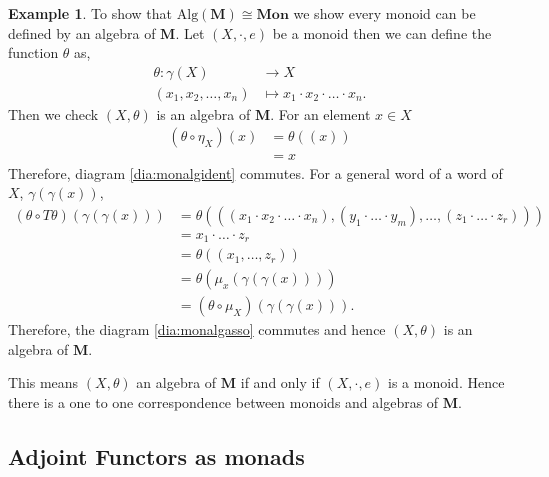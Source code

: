 \documentclass[11pt,a4paper]{article}
\theoremstyle{definition}
\newtheorem{example}[thm]{Example}
\newcommand{\alg}[1]{\mathrm{Alg}(\mathbf{#1})}
\numberwithin{equation}{section}
\begin{document}
\begin{example}
    To show that $\alg{M} \cong \mathbf{Mon}$ we show every monoid can be defined by an algebra of $\mathbf{M}$.
    Let $(X,\cdot,e)$ be a monoid then we can define the function $\theta$ as,
    \begin{align*}
        \theta\colon \gamma(X)&\to X\\
        (x_1,x_2,\dots,x_n)&\mapsto x_1 \cdot x_2 \cdot \dots \cdot x_n.
    \end{align*}
    Then we check $(X,\theta)$ is an algebra of $\mathbf{M}$. For an element $x\in X$
    \begin{align*}
        (\theta \circ \eta_{X}) (x) &= \theta((x)) \\
        &= x
    \end{align*}
    Therefore, diagram \eqref{dia:monalgident} commutes. For a general word of a word of $X$, $\gamma(\gamma(x))$,
    \begin{align*}
        (\theta \circ T\theta)(\gamma(\gamma(x))) &= \theta(((x_1\cdot x_2\cdot\dots \cdot x_{n}),(y_1\cdot\dots\cdot y_m),\dots,(z_1\cdot\dots\cdot z_r))) \\
        &= x_1\cdot\dots\cdot z_r\\
        &= \theta((x_1,\dots, z_r))\\
        &= \theta(\mu_{x}(\gamma(\gamma(x))))\\
        &= (\theta\circ \mu_{X}) (\gamma(\gamma(x))).
    \end{align*}
    Therefore, the diagram \eqref{dia:monalgasso} commutes and hence $(X,\theta)$ is an algebra of $\mathbf{M}$.
    
    This means $(X,\theta)$ an algebra of $\mathbf{M}$ if and only if $(X,\cdot,e)$ is a monoid. Hence there is a one to one correspondence between monoids and algebras of $\mathbf{M}$.
    \end{example}


\subsection{Adjoint Functors as monads}
\label{ss:adjfuncmon}
\end{document}

